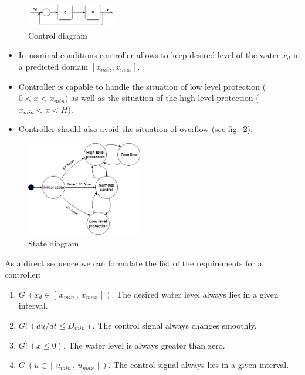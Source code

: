 \documentclass{article}
\begin{document}
\begin{figure}[ht]
\centering
\includegraphics[width=0.35\textwidth]{Pic/wt_cd.png}
\caption{Control diagram}
\label{Control_Diag}
\end{figure}

\begin{itemize}
\item In nominal conditions controller allows to keep desired level of the water $x_d$ in a predicted domain $[x_{min}, x_{max}]$.
\item Controller is capable to handle the situation of low level protection ($0 < x < x_{min}$) as well as the situation of the high level protection  ($x_{min} < x < H$).
\item Controller should also avoid the situation of overflow (see fig.~\ref{State_Diag}).
\end{itemize}

\begin{figure}[ht]
\centering
\includegraphics[width=0.45\textwidth]{Pic/wt_st.png}
\caption{State diagram}
\label{State_Diag}
\end{figure}

As a direct sequence we can formulate the list of the requirements for a controller:
\begin{enumerate}
	\item  {$G\ (x_d   \in  [\, x_{min}\, , \, x_{max} \,])$. The desired water level always lies in a given interval. }
	\item  {$G!\ (du/dt \leq D_{min})$. The control signal always changes smoothly.}
	\item  {$G!\ (x \leq 0)$. The water level is always  greater than zero.}
	\item  {$G\ (u   \in  [\, u_{min} \, , \,  u_{max} \, ])$. The control signal always lies in a given interval.}
\end{enumerate}
\end{document}
